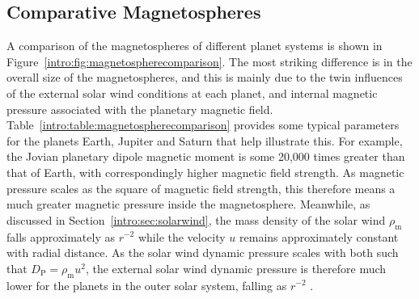 {\subsection{Comparative Magnetospheres}\label{intro:sec:comparativemagnetospheres}
A comparison of the magnetospheres of different planet systems is shown in Figure~\ref{intro:fig:magnetospherecomparison}. The most striking difference is in the overall size of the magnetospheres, and this is mainly due to the twin influences of the external solar wind conditions at each planet, and internal magnetic pressure associated with the planetary magnetic field. Table~\ref{intro:table:magnetospherecomparison} provides some typical parameters for the planets Earth, Jupiter and Saturn that help illustrate this. For example, the Jovian planetary dipole magnetic moment is some 20,000 times greater than that of Earth, with correspondingly higher magnetic field strength. As magnetic pressure scales as the square of magnetic field strength, this therefore means a much greater magnetic pressure inside the magnetosphere. Meanwhile, as discussed in Section~\ref{intro:sec:solarwind}, the mass density of the solar wind $\rho_\mathrm{m}$ falls approximately as $r^{-2}$ while the velocity $u$ remains approximately constant with radial distance. As the solar wind dynamic pressure scales with both such that $D_\mathrm{P} = \rho_\mathrm{m}u^2$, the external solar wind dynamic pressure is therefore much lower for the planets in the outer solar system, falling as $r^{-2}$ .

}
